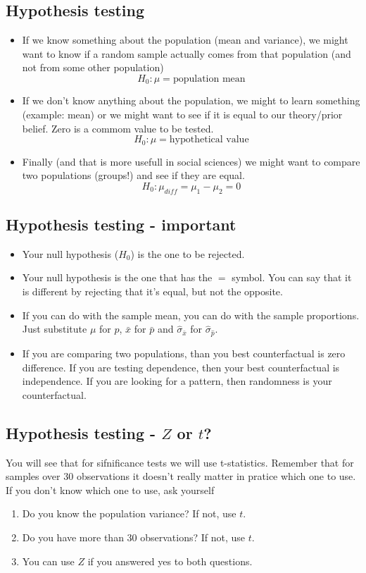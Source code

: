 \documentclass[11pt]{article}
\begin{document}
	\subsection*{Hypothesis testing}
	\begin{itemize}
		\item If we know something about the population (mean and variance), we might want to know if a random sample actually comes from that population (and not from some other population)
		\[H_0: \mu = \text{population mean}\]
		\item If we don't know anything about the population, we might to learn something (example: mean) or we might want to see if it is equal to our theory/prior belief. Zero is a commom value to be tested.
		\[H_0: \mu = \text{hypothetical value} \]
		\item Finally (and that is more usefull in social sciences) we might want to compare two populations (groups!) and see if they are equal.
		\[H_0: \mu_{diff} = \mu_1 - \mu_2 = 0\]
	\end{itemize}


	\subsection*{Hypothesis testing - important}
	\begin{itemize}
		\item Your null hypothesis ($H_0$) is the one to be rejected.
		\item Your null hypothesis is the one that has the $=$ symbol. You can say that it is different by rejecting that it's equal, but not the opposite.
		\item If you can do with the sample mean, you can do with the sample proportions. Just substitute $\mu$ for $p$, $\bar{x}$ for $\bar{p}$ and $\hat{\sigma}_{\bar{x}}$ for $\hat{\sigma}_{\hat{p}}$.
		\item If you are comparing two populations, than you best counterfactual is zero difference. If you are testing dependence, then your best counterfactual is independence. If you are looking for a pattern, then randomness is your counterfactual.
	\end{itemize}

	\subsection*{Hypothesis testing - $Z$ or $t$?}
	You will see that for sifnificance tests we will use t-statistics. Remember that for samples over 30 observations it doesn't really matter in pratice which one to use. If you don't know which one to use, ask yourself
	\begin{enumerate}
		\item Do you know the population variance? If not, use $t$.
		\item Do you have more than 30 observations? If not, use $t$.
		\item You can use $Z$ if you answered yes to both questions.
	\end{enumerate}
\end{document}
